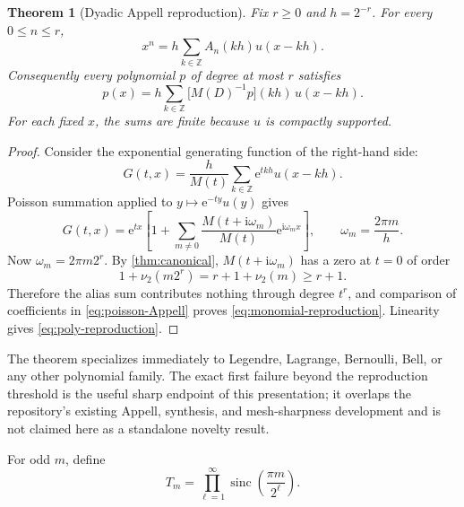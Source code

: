 \documentclass[11pt,oneside]{article}
\newtheorem{theorem}{Theorem}[section]
\theoremstyle{definition}
\theoremstyle{remark}
\newcommand{\Z}{\mathbb Z}
\newcommand{\sinc}{\operatorname{sinc}}
\newcommand{\e}{\mathrm e}
\newcommand{\ii}{\mathrm i}
\begin{document}
\begin{theorem}[Dyadic Appell reproduction]
\label{thm:reproduction}
Fix \(r\geq0\) and \(h=2^{-r}\).  For every \(0\leq n\leq r\),
\begin{equation}
 \boxed{\displaystyle
 x^n=h\sum_{k\in\Z}A_n(kh)u(x-kh).}
 \label{eq:monomial-reproduction}
\end{equation}
Consequently every polynomial \(p\) of degree at most \(r\) satisfies
\begin{equation}
 p(x)
 =h\sum_{k\in\Z}
 \bigl[M(D)^{-1}p\bigr](kh)\,u(x-kh).
 \label{eq:poly-reproduction}
\end{equation}
For each fixed \(x\), the sums are finite because \(u\) is compactly
supported.
\end{theorem}

\begin{proof}
Consider the exponential generating function of the right-hand side:
\[
 G(t,x)
 =\frac h{M(t)}
  \sum_{k\in\Z}\e^{tkh}u(x-kh).
\]
Poisson summation applied to \(y\mapsto\e^{-ty}u(y)\) gives
\begin{equation}
 G(t,x)
 =\e^{tx}
 \left[
  1+\sum_{m\neq0}
   \frac{M(t+\ii\omega_m)}{M(t)}
   \e^{\ii\omega_mx}
 \right],
 \qquad
 \omega_m=\frac{2\pi m}{h}.
 \label{eq:poisson-Appell}
\end{equation}
Now \(\omega_m=2\pi m2^r\).  By \cref{thm:canonical},
\(M(t+\ii\omega_m)\) has a zero at \(t=0\) of order
\[
 1+\nu_2(m2^r)=r+1+\nu_2(m)\geq r+1.
\]
Therefore the alias sum contributes nothing through degree \(t^r\), and
comparison of coefficients in \eqref{eq:poisson-Appell} proves
\eqref{eq:monomial-reproduction}.  Linearity gives
\eqref{eq:poly-reproduction}.
\end{proof}

The theorem specializes immediately to Legendre, Lagrange, Bernoulli, Bell,
or any other polynomial family.  The exact first failure beyond the
reproduction threshold is the useful sharp endpoint of this presentation; it
overlaps the repository's existing Appell, synthesis, and mesh-sharpness
development and is not claimed here as a standalone novelty result.

For odd \(m\), define
\begin{equation}
 T_m=\prod_{\ell=1}^{\infty}
 \sinc\!\left(\frac{\pi m}{2^\ell}\right).
 \label{eq:Tm}
\end{equation}
\end{document}
